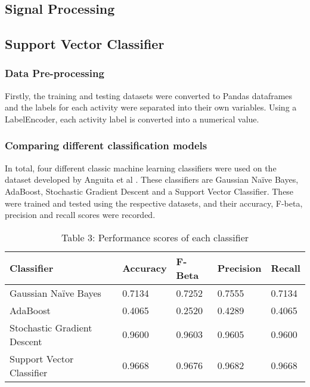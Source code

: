 \subsection{Signal Processing}

\subsection{Support Vector Classifier}
    \subsubsection{Data Pre-processing}
        Firstly, the training and testing datasets were converted to Pandas dataframes and the labels for each activity were separated into their own variables.
        Using a LabelEncoder, each activity label is converted into a numerical value.

    \subsubsection{Comparing different classification models}
        In total, four different classic machine learning classifiers were used on the dataset developed by Anguita et al \cite{Anguita2012}. These classifiers are Gaussian Naïve Bayes,
        AdaBoost, Stochastic Gradient Descent and a Support Vector Classifier. These were trained and tested using the respective datasets, and their accuracy,
        F-beta, precision and recall scores were recorded.

        \begin{table}[ht]
            \centering\footnotesize
            \begin{tabular}{|l|l|l|l|l|}
                \hline
                \textbf{Classifier} & \textbf{Accuracy} & \textbf{F-Beta}  & \textbf{Precision} & \textbf{Recall} \\ \hline
                Gaussian Naïve Bayes             & 0.7134           & 0.7252  & 0.7555 & 0.7134 \\ \hline
                AdaBoost            & 0.4065           & 0.2520 & 0.4289 & 0.4065 \\ \hline
                Stochastic Gradient Descent               & 0.9600           & 0.9603 & 0.9605 & 0.9600 \\ \hline
                Support Vector Classifier            & 0.9668           & 0.9676 & 0.9682 & 0.9668 \\ \hline
            \end{tabular}
            \caption*{Table 3: Performance scores of each classifier}
        \end{table}

